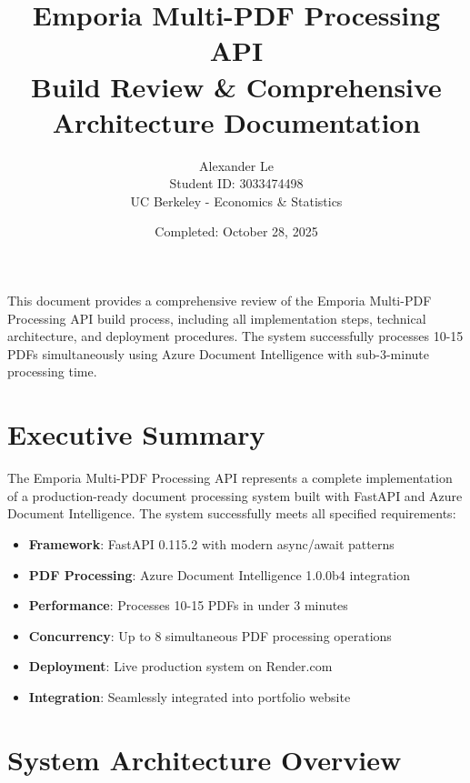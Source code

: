 \documentclass[11pt]{article}
\title{\vspace{-0.5cm}\huge\textbf{Emporia Multi-PDF Processing API}\\[0.3cm]
\Large Build Review \& Comprehensive Architecture Documentation}
\author{
    \large Alexander Le \\[0.1cm]
    \normalsize Student ID: 3033474498 \\[0.1cm]
    \normalsize UC Berkeley - Economics \& Statistics
}
\date{\normalsize Completed: October 28, 2025}
\begin{document}
\maketitle

\begin{notebox}
This document provides a comprehensive review of the Emporia Multi-PDF Processing API build process, including all implementation steps, technical architecture, and deployment procedures. The system successfully processes 10-15 PDFs simultaneously using Azure Document Intelligence with sub-3-minute processing time.
\end{notebox}

\vspace{0.5cm}

\section*{Executive Summary}

The Emporia Multi-PDF Processing API represents a complete implementation of a production-ready document processing system built with FastAPI and Azure Document Intelligence. The system successfully meets all specified requirements:

\begin{itemize}
    \item \textbf{Framework}: FastAPI 0.115.2 with modern async/await patterns
    \item \textbf{PDF Processing}: Azure Document Intelligence 1.0.0b4 integration
    \item \textbf{Performance}: Processes 10-15 PDFs in under 3 minutes
    \item \textbf{Concurrency}: Up to 8 simultaneous PDF processing operations
    \item \textbf{Deployment}: Live production system on Render.com
    \item \textbf{Integration}: Seamlessly integrated into portfolio website
\end{itemize}

\section*{System Architecture Overview}
\end{document}
